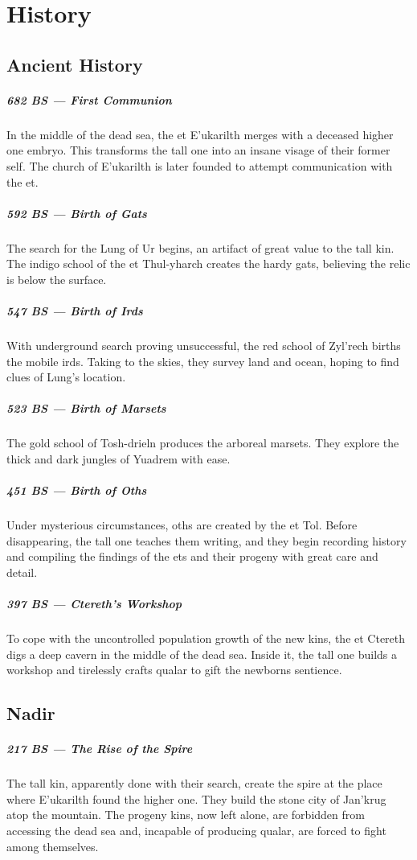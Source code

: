 \section{History}
\begin{linenumbers}
\subsection*{Ancient History}
\subparagraph{682 BS --- First Communion} In the middle of the dead sea, the et E'ukarilth merges with a deceased higher one embryo.
This transforms the tall one into an insane visage of their former self.
The church of E'ukarilth is later founded to attempt communication with the et.

\subparagraph{592 BS --- Birth of Gats} The search for the Lung of Ur begins, an artifact of great value to the tall kin.
The indigo school of the et Thul-yharch creates the hardy gats, believing the relic is below the surface.

\subparagraph{547 BS --- Birth of Irds} With underground search proving unsuccessful, the red school of Zyl'rech births the mobile irds.
Taking to the skies, they survey land and ocean, hoping to find clues of Lung's location.

\subparagraph{523 BS --- Birth of Marsets} The gold school of Tosh-drieln produces the arboreal marsets.
They explore the thick and dark jungles of Yuadrem with ease.

\subparagraph{451 BS --- Birth of Oths} Under mysterious circumstances, oths are created by the et Tol.
Before disappearing, the tall one teaches them writing, and they begin recording history and compiling the findings of the ets and their progeny with great care and detail.

\subparagraph{397 BS --- Ctereth's Workshop} To cope with the uncontrolled population growth of the new kins, the et Ctereth digs a deep cavern in the middle of the dead sea.
Inside it, the tall one builds a workshop and tirelessly crafts qualar to gift the newborns sentience.

\subsection*{Nadir}
\subparagraph{217 BS --- The Rise of the Spire} The tall kin, apparently done with their search, create the spire at the place where E'ukarilth found the higher one.
They build the stone city of Jan'krug atop the mountain.
The progeny kins, now left alone, are forbidden from accessing the dead sea and, incapable of producing qualar, are forced to fight among themselves.


\end{linenumbers}
